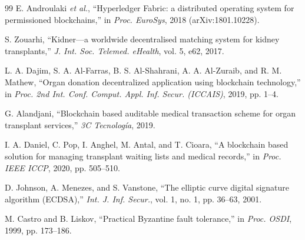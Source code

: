 \documentclass[journal]{IEEEtran}
\begin{document}
\begin{thebibliography}{99}
E. Androulaki \textit{et al.},
``Hyperledger Fabric: a distributed operating system for permissioned blockchains,''
in \textit{Proc. EuroSys}, 2018 (arXiv:1801.10228).

S. Zouarhi,
``Kidner---a worldwide decentralised matching system for kidney transplants,''
\textit{J. Int. Soc. Telemed. eHealth}, vol. 5, e62, 2017.

L. A. Dajim, S. A. Al-Farras, B. S. Al-Shahrani, A. A. Al-Zuraib, and R. M. Mathew,
``Organ donation decentralized application using blockchain technology,''
in \textit{Proc. 2nd Int. Conf. Comput. Appl. Inf. Secur. (ICCAIS)}, 2019, pp. 1--4.

G. Alandjani,
``Blockchain based auditable medical transaction scheme for organ transplant services,''
\textit{3C Tecnolog\'ia}, 2019.

I. A. Daniel, C. Pop, I. Anghel, M. Antal, and T. Cioara,
``A blockchain based solution for managing transplant waiting lists and medical records,''
in \textit{Proc. IEEE ICCP}, 2020, pp. 505--510.

D. Johnson, A. Menezes, and S. Vanstone,
``The elliptic curve digital signature algorithm (ECDSA),''
\textit{Int. J. Inf. Secur.}, vol. 1, no. 1, pp. 36--63, 2001.

M. Castro and B. Liskov,
``Practical Byzantine fault tolerance,''
in \textit{Proc. OSDI}, 1999, pp. 173--186.

\end{thebibliography}
\end{document}
